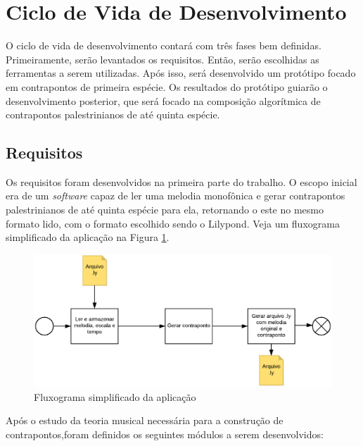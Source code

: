   \section[Ciclo de Vida de Desenvolvimento]{Ciclo de Vida de Desenvolvimento}

    O ciclo de vida de desenvolvimento contará com três fases bem definidas. Primeiramente, serão levantados os requisitos. Então, serão escolhidas as ferramentas a serem utilizadas. Após isso, será desenvolvido um protótipo focado em contrapontos de primeira espécie. Os resultados do protótipo guiarão o desenvolvimento posterior, que será focado na composição algorítmica de contrapontos palestrinianos de até quinta espécie.

  \subsection[Requisitos]{Requisitos}

    Os requisitos foram desenvolvidos na primeira parte do trabalho. O escopo inicial era de um \textit{software} capaz de ler uma melodia monofônica e gerar contrapontos palestrinianos de até quinta espécie para ela, retornando o este no mesmo formato lido, com o formato escolhido sendo o Lilypond. Veja um fluxograma simplificado da aplicação na Figura \ref{fluxograma}.

    \begin{figure}[htb]
      \centering
      \includegraphics[scale=0.45]{figuras/fluxograma.eps}
      \caption{Fluxograma simplificado da aplicação}
      \label{fluxograma}
    \end{figure}


    Após o estudo da teoria musical necessária para a construção de contrapontos,foram definidos os seguintes módulos a serem desenvolvidos:

